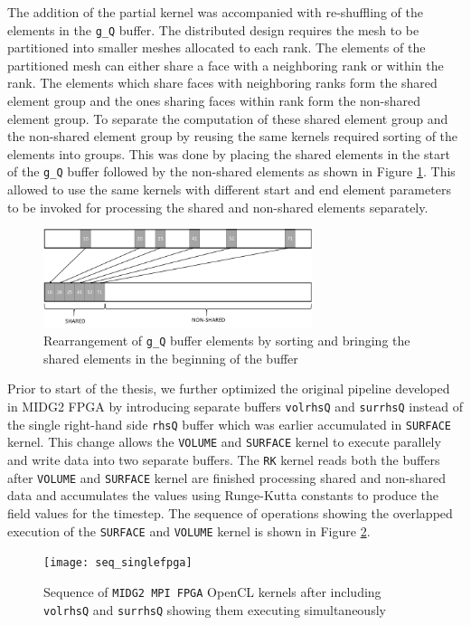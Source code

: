 The addition of the partial kernel was accompanied with re-shuffling of the elements in the \texttt{g\_Q}
buffer. The distributed design requires the mesh to be partitioned into smaller meshes allocated
to each rank. The elements of the partitioned mesh can either share a face with a neighboring
rank or within the rank. The elements which share faces with neighboring ranks form the shared
element group and the ones sharing faces within rank form the non-shared element group.
To separate the computation of these shared element group and the non-shared element group
by reusing the same kernels required sorting of the elements into groups. This was done by
placing the shared elements in the start of the \texttt{g\_Q} buffer followed by the non-shared
elements as shown in Figure \ref{fig:rearrange}. This allowed to use the same kernels with different
start and end element parameters to be invoked for processing the shared and non-shared elements separately.
\begin{figure}%
    \centering
    \includegraphics[width=0.7\textwidth]{images/rearrange}
    \caption{Rearrangement of \texttt{g\_Q} buffer elements by sorting and bringing the
    shared elements in the beginning of the buffer}
    \label{fig:rearrange}
\end{figure}

Prior to start of the thesis, we further optimized the original pipeline developed in MIDG2 FPGA
by introducing separate buffers \texttt{volrhsQ} and \texttt{surrhsQ} instead of the single
right-hand side \texttt{rhsQ} buffer which was earlier accumulated in \texttt{SURFACE} kernel.
This change allows the \texttt{VOLUME} and \texttt{SURFACE} kernel to execute parallely and write data into
two separate buffers. The \texttt{RK} kernel reads both the buffers after \texttt{VOLUME} and \texttt{SURFACE} kernel
are finished processing shared and non-shared data and accumulates the values using Runge-Kutta
constants to produce the field values for the timestep. The sequence of operations
showing the overlapped execution of the \texttt{SURFACE} and \texttt{VOLUME} kernel is shown in Figure \ref{fig:seq_singlefpga}.

\begin{figure}[ht]%
    \centering
    \texttt{[image: seq\_singlefpga]}
    \caption{Sequence of \texttt{MIDG2 MPI FPGA} OpenCL kernels after including \texttt{volrhsQ} and \texttt{surrhsQ}
    showing them executing simultaneously}
    \label{fig:seq_singlefpga}
\end{figure}

